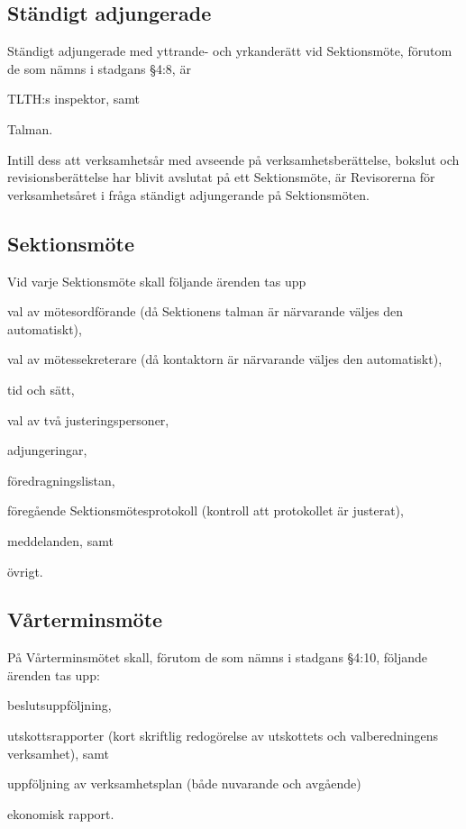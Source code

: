 \documentclass[10pt]{article}
\begin{document}
\subsection{Ständigt adjungerade}
Ständigt adjungerade med yttrande- och yrkanderätt vid Sektionsmöte,
förutom de som nämns i stadgans §4:8, är

\begin{alphlist}
    \item TLTH:s inspektor, samt
    \item Talman.
\end{alphlist}

Intill dess att verksamhetsår med avseende på verksamhetsberättelse,
bokslut och revisionsberättelse har blivit avslutat på ett Sektionsmöte,
är Revisorerna för verksamhetsåret i fråga ständigt adjungerande på
Sektionsmöten.

\subsection{Sektionsmöte}
Vid varje Sektionsmöte skall följande ärenden tas upp

\begin{alphlist}
    \item val av mötesordförande (då Sektionens talman är närvarande
        väljes den automatiskt),
    \item val av mötessekreterare (då kontaktorn är närvarande väljes
        den automatiskt),
    \item tid och sätt,
    \item val av två justeringspersoner,
    \item adjungeringar,
    \item föredragningslistan,
    \item föregående Sektionsmötesprotokoll (kontroll att protokollet
        är justerat),
    \item meddelanden, samt
    \item övrigt.
\end{alphlist}

\subsection{Vårterminsmöte}
På Vårterminsmötet skall, förutom de som nämns i stadgans §4:10,
följande ärenden tas upp:
\begin{alphlist}
    \item beslutsuppföljning,
    \item utskottsrapporter (kort skriftlig redogörelse av utskottets och valberedningens verksamhet), samt
    \item uppföljning av verksamhetsplan (både nuvarande och avgående)
    \item ekonomisk rapport.
\end{alphlist}
\end{document}
